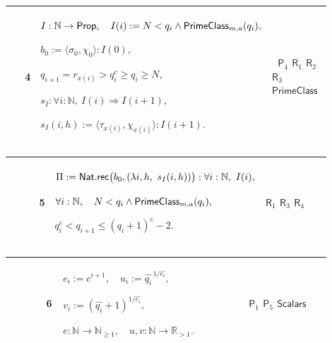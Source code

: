 \documentclass[12pt,reqno]{amsart}
\theoremstyle{blueplain}
\numberwithin{equation}{section}
\begin{document}
{\scriptsize \setlength{\parskip}{0pt}\nointerlineskip
\noindent 
\begin{tabular}{|@{}>{\centering\arraybackslash}m{0.10658\linewidth}|>{\centering\arraybackslash}m{0.03553\linewidth}|>{\centering\arraybackslash}m{0.52105\linewidth}|>{\centering\arraybackslash}m{0.23684\linewidth}|}
\hline
{\hypertarget{row:R4}{$\mathsf{R}$}} & {4} & {$\displaystyle I:\mathbb{N}\to%
\mathsf{Prop},\quad I(i):=N<q_i\wedge \hyperlink{def:PrimeClass}{\mathsf{%
PrimeClass} }_{m,a}(q_i),$ \par$\displaystyle b_0:=\langle\sigma_0,\chi_0%
\rangle:I(0),$ \par$\displaystyle q_{i+1}=r_{x(i)}>q_i^c\ge q_i\ge N,$ \par$%
\displaystyle s_I:\forall i:\mathbb{N},\ I(i)\Rightarrow I(i+1),$ \par$%
\displaystyle s_I(i,h):=\langle\tau_{x(i)},\chi_{x(i)}\rangle:I(i+1).$} & {\ 
\hyperlink{row:P4}{$\mathsf{P}_{4}$} \hyperlink{row:R1}{$\mathsf{R}_{1}$} 
\hyperlink{row:R2}{$\mathsf{R}_{2}$} \hyperlink{row:R3}{$\mathsf{R}_{3}$} 
\hyperlink{def:PrimeClass}{$\mathsf{PrimeClass}$}} \\ \hline
\end{tabular}
}

{\scriptsize \setlength{\parskip}{0pt}\nointerlineskip
\noindent 
\begin{tabular}{|@{}>{\centering\arraybackslash}m{0.10658\linewidth}|>{\centering\arraybackslash}m{0.03553\linewidth}|>{\centering\arraybackslash}m{0.52105\linewidth}|>{\centering\arraybackslash}m{0.23684\linewidth}|}
\hline
{\hypertarget{row:P5}{$\mathsf{P}$}} & {5} & {$\displaystyle \Pi:=\mathsf{%
Nat.rec}\bigl(b_0,(\lambda i,h,\ s_I(i,h))\bigr):\forall i:\mathbb{N},\
I(i), $ \par$\displaystyle \forall i:\mathbb{N},\quad N<q_i\wedge \hyperlink{def:PrimeClass}%
{\mathsf{PrimeClass} }_{m,a}(q_i),$ \par$\displaystyle q_i^c<q_{i+1}%
\le(q_i+1)^c-2.$} & {\hyperlink{row:R1}{$\mathsf{R}_{1}$} \hyperlink{row:R3}{%
$\mathsf{R}_{3}$} \hyperlink{row:R4}{$\mathsf{R}_{4}$}} \\ \hline
\end{tabular}%
}

{\scriptsize \setlength{\parskip}{0pt}\nointerlineskip
\noindent 
\begin{tabular}{|@{}>{\centering\arraybackslash}m{0.10658\linewidth}|>{\centering\arraybackslash}m{0.03553\linewidth}|>{\centering\arraybackslash}m{0.52105\linewidth}|>{\centering\arraybackslash}m{0.23684\linewidth}|}
\hline
{\hypertarget{row:P6}{$\mathsf{P}$}} & {6} & {$\displaystyle %
e_i:=c^{i+1},\quad u_i:=\widehat{q_i}^{\,1/\widehat{e_i}},$ \par$%
\displaystyle v_i:=(\widehat{q_i}+1)^{1/\widehat{e_i}},$ \par$\displaystyle %
e:\mathbb{N}\to\mathbb{N}_{\ge1},\quad u,v:\mathbb{N}\to\mathbb{R}_{>1}.$} & 
{\hyperlink{row:P1}{$\mathsf{P}_{1}$} \hyperlink{row:P5}{$\mathsf{P}_{5}$} 
\hyperlink{def:Scalars}{$\mathsf{Scalars}$}} \\ \hline
\end{tabular}%
}
\end{document}
